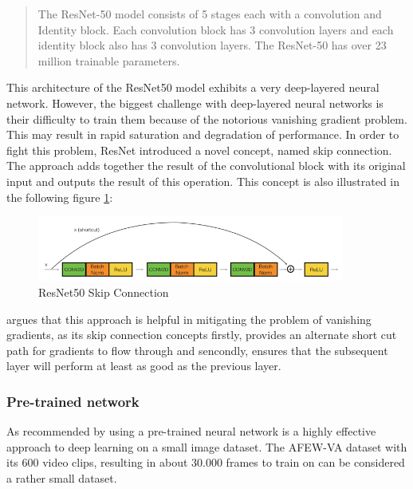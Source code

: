\begin{quote}
    The ResNet-50 model consists of 5 stages each with a convolution and Identity block. Each convolution block has 3 convolution layers and each identity block also has 3 convolution layers. The ResNet-50 has over 23 million trainable parameters. \citep{Dwivedi:2019:ResNetInKeras}
\end{quote}

This architecture of the ResNet50 model exhibits a very deep-layered neural network. However, the biggest challenge with deep-layered neural networks is their difficulty to train them because of the notorious vanishing gradient problem. This may result in rapid saturation and degradation of performance. In order to fight this problem, ResNet introduced a novel concept, named skip connection. The approach adds together the result of the convolutional block with its original input and outputs the result of this operation. \citep{Dwivedi:2019:ResNetInKeras}\newline
This concept is also illustrated in the following figure \ref{fig:ResNet50SkipConnection}:

\begin{figure}[H]
  \begin{center}
  \includegraphics[angle=0, width=0.9\textwidth]{Figures/skip_connection.png}
  \caption{ResNet50 Skip Connection\citep{Dwivedi:2019:ResNetInKeras}}
  \label{fig:ResNet50SkipConnection}
  \end{center}
\end{figure}

\citet{Dwivedi:2019:ResNetInKeras} argues that this approach is helpful in mitigating the problem of vanishing gradients, as its skip connection concepts firstly, provides an alternate short cut path for gradients to flow through and sencondly, ensures that the subsequent layer will perform at least as good as the previous layer.

\subsubsection{Pre-trained network}
As recommended by \citet{Chollet:2017:DeepLearningPython} using a pre-trained neural network is a highly effective approach to deep learning on a small image dataset. The AFEW-VA dataset with its 600 video clips, resulting in about 30.000 frames to train on can be considered a rather small dataset.\citep{Kossaifi:2017:AFEW-VADatabase}

